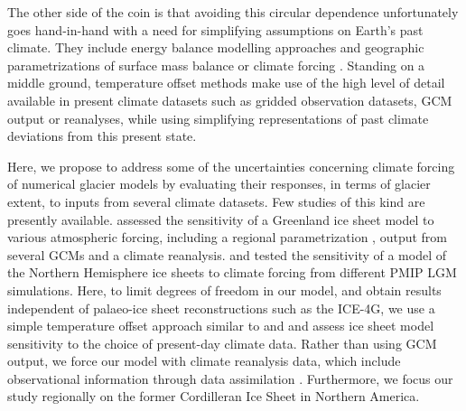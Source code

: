 The other side of the coin is that avoiding this circular dependence unfortunately goes hand-in-hand with a need for simplifying assumptions on Earth's past climate. They include energy balance modelling approaches \citep{tarasov-peltier-1997} and geographic parametrizations of surface mass balance \citep{robert-1991} or climate forcing \citep{johnson-fastook-2002}. Standing on a middle ground, temperature offset methods \citep{greve-etal-1999,bintanja-etal-2005} make use of the high level of detail available in present climate datasets such as gridded observation datasets, GCM output or reanalyses, while using simplifying representations of past climate deviations from this present state.

Here, we propose to address some of the uncertainties concerning climate forcing of numerical glacier models by evaluating their responses, in terms of glacier extent, to inputs from several climate datasets. Few studies of this kind are presently available. \citet{quiquet-etal-2012} assessed the sensitivity of a Greenland ice sheet model to various atmospheric forcing, including a regional parametrization \citep{fausto-etal-2009}, output from several GCMs and a climate reanalysis. \citet{rodgers-etal-2004} and \citet{charbit-etal-2007} tested the sensitivity of a model of the Northern Hemisphere ice sheets to climate forcing from different PMIP LGM simulations. Here, to limit degrees of freedom in our model, and obtain results independent of palaeo-ice sheet reconstructions such as the ICE-4G, we use a simple temperature offset approach similar to \citet{greve-etal-1999} and \citet{bintanja-etal-2005} and assess ice sheet model sensitivity to the choice of present-day climate data. Rather than using GCM output, we force our model with climate reanalysis data, which include observational information through data assimilation \citep{bengtsson-etal-2007}. Furthermore, we focus our study regionally on the former Cordilleran Ice Sheet in Northern America.

